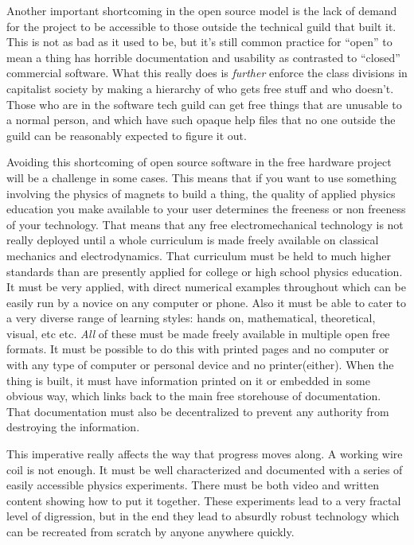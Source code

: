 Another important shortcoming in the open source model is the lack of
demand for the project to be accessible to those outside the technical
guild that built it. This is not as bad as it used to be, but it's still
common practice for ``open'' to mean a thing has horrible documentation
and usability as contrasted to ``closed'' commercial software. What this
really does is \emph{further} enforce the class divisions in capitalist
society by making a hierarchy of who gets free stuff and who doesn't.
Those who are in the software tech guild can get free things that are
unusable to a normal person, and which have such opaque help files that
no one outside the guild can be reasonably expected to figure it out.

Avoiding this shortcoming of open source software in the free hardware
project will be a challenge in some cases. This means that if you want
to use something involving the physics of magnets to build a thing, the
quality of applied physics education you make available to your user
determines the freeness or non freeness of your technology. That means
that any free electromechanical technology is not really deployed until
a whole curriculum is made freely available on classical mechanics and
electrodynamics. That curriculum must be held to much higher standards
than are presently applied for college or high school physics education.
It must be very applied, with direct numerical examples throughout which
can be easily run by a novice on any computer or phone. Also it must be
able to cater to a very diverse range of learning styles: hands on,
mathematical, theoretical, visual, etc etc. \emph{All} of these must be
made freely available in multiple open free formats. It must be possible
to do this with printed pages and no computer or with any type of
computer or personal device and no printer(either). When the thing is
built, it must have information printed on it or embedded in some
obvious way, which links back to the main free storehouse of
documentation. That documentation must also be decentralized to prevent
any authority from destroying the information.

This imperative really affects the way that progress moves along. A
working wire coil is not enough. It must be well characterized and
documented with a series of easily accessible physics experiments. There
must be both video and written content showing how to put it together.
These experiments lead to a very fractal level of digression, but in the
end they lead to absurdly robust technology which can be recreated from
scratch by anyone anywhere quickly.

